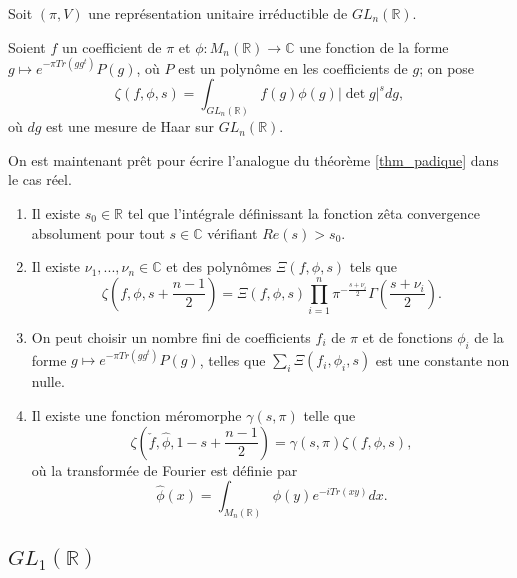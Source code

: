 Soit $(\pi, V)$ une représentation unitaire irréductible de $GL_n(\mathbb{R})$.
\begin{definition}
Soient $f$ un coefficient de $\pi$ et $\phi : M_n(\mathbb{R}) \rightarrow \mathbb{C}$ une fonction de la forme
$g \mapsto e^{-\pi Tr(gg^t)}P(g)$, où $P$ est un polynôme en les coefficients de $g$; on pose
\begin{equation}
\zeta(f, \phi, s) = \int_{GL_n(\mathbb{R})} f(g) \phi(g) |\det g|^s dg,
\end{equation}
où $dg$ est une mesure de Haar sur $GL_n(\mathbb{R})$.
\end{definition}

On est maintenant prêt pour écrire l'analogue du théorème \ref{thm_padique} dans le cas réel.
\begin{theoreme}
\label{thm_reel}
\begin{enumerate}
\item Il existe $s_0 \in \mathbb{R}$ tel que l'intégrale définissant la fonction zêta convergence absolument pour tout $s \in \mathbb{C}$ vérifiant $Re(s) > s_0$.
\item Il existe $\nu_1, ..., \nu_n \in \mathbb{C}$ et des polynômes $\Xi(f,\phi,s)$ tels que
\begin{equation}
\zeta(f, \phi, s+ \frac{n-1}{2}) = \Xi(f, \phi, s)\prod_{i=1}^n \pi^{-\frac{s+\nu_i}{2}}\Gamma(\frac{s+\nu_i}{2}).
\end{equation}
\item On peut choisir un nombre fini de coefficients $f_i$ de $\pi$ et de fonctions $\phi_i$ de la forme $g \mapsto e^{-\pi Tr(gg^t)}P(g)$, telles que $\sum_i \Xi(f_i, \phi_i, s)$ est une constante non nulle.
\item Il existe une fonction méromorphe $\gamma(s, \pi)$ telle que
\begin{equation}
\zeta(\check{f}, \hat{\phi}, 1-s+\frac{n-1}{2}) = \gamma(s, \pi)\zeta(f, \phi, s),
\end{equation}
où la transformée de Fourier est définie par
\begin{equation}
\hat{\phi}(x) = \int_{M_n(\mathbb{R})}\phi(y)e^{-iTr(xy)}dx.
\end{equation}
\end{enumerate}
\end{theoreme}

\subsection{$GL_1(\mathbb{R})$}


